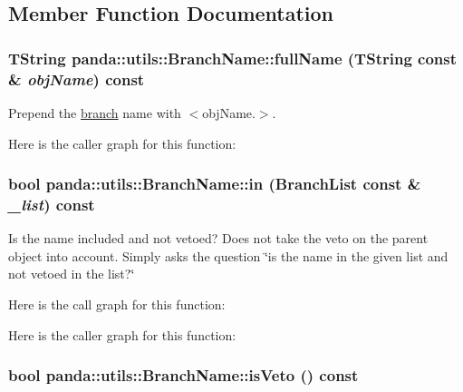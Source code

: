 \subsection{Member Function Documentation}
\hypertarget{classpanda_1_1utils_1_1BranchName_a13958ff4a9d554d2c057c600b4f70412}{
\subsubsection[{fullName}]{\setlength{\rightskip}{0pt plus 5cm}TString panda::utils::BranchName::fullName (TString const \& {\em objName}) const}}
\label{classpanda_1_1utils_1_1BranchName_a13958ff4a9d554d2c057c600b4f70412}


Prepend the \hyperlink{namespacepanda_1_1branch}{branch} name with $<$objName.$>$. 

Here is the caller graph for this function:\hypertarget{classpanda_1_1utils_1_1BranchName_a6cc8a6df7c5b12a0221fd49773cca6a7}{
\subsubsection[{in}]{\setlength{\rightskip}{0pt plus 5cm}bool panda::utils::BranchName::in ({\bf BranchList} const \& {\em \_\-list}) const}}
\label{classpanda_1_1utils_1_1BranchName_a6cc8a6df7c5b12a0221fd49773cca6a7}


Is the name included and not vetoed? Does not take the veto on the parent object into account. Simply asks the question \char`\"{}is the name in the given list and not vetoed in the list?\char`\"{} 

Here is the call graph for this function:

Here is the caller graph for this function:\hypertarget{classpanda_1_1utils_1_1BranchName_a7de81c2b318b47f8062ac9096a2640fc}{
\subsubsection[{isVeto}]{\setlength{\rightskip}{0pt plus 5cm}bool panda::utils::BranchName::isVeto () const}}
\label{classpanda_1_1utils_1_1BranchName_a7de81c2b318b47f8062ac9096a2640fc}


